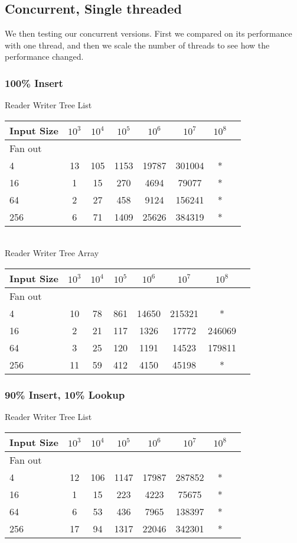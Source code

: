 \documentclass{sig-alternate}
\begin{document}
\subsection{Concurrent, Single threaded}
We then testing our concurrent versions.
First we compared on its performance with one thread, and then we scale the number of threads to see how the performance changed.

\subsubsection{100\% Insert}
Reader Writer Tree List \\
\begin{tabular}{| l | c | c | c | c | c | c | r}
  \hline
  Input Size & $10^3$ & $10^4$ & $10^5$ & $10^6$ & $10^7$ & $10^8$ \\ \hline
  Fan out & & & & & &  \\  \hline
  4			&	13 & 105 & 1153 & 19787 & 301004 & * \\
  16		&	1 & 15 & 270 & 4694 & 79077 & * \\
  64		&	2 & 27 & 458 & 9124 & 156241 & * \\
  256		&	6 & 71 & 1409 & 25626 & 384319 & * \\
  \hline
\end{tabular} \\

Reader Writer Tree Array \\
\begin{tabular}{| l | c | c | c | c | c | c | r}
  \hline
  Input Size & $10^3$ & $10^4$ & $10^5$ & $10^6$ & $10^7$ & $10^8$ \\ \hline
  Fan out & & & & & &  \\  \hline
  4			&	10 & 78 & 861 & 14650 & 215321 & * \\
  16		&	2 & 21 & 117 & 1326 & 17772 & 246069 \\
  64		&	3 & 25 & 120 & 1191 & 14523 & 179811 \\
  256		&	11 & 59 & 412 & 4150 & 45198 & * \\
  \hline
\end{tabular} 


\subsubsection{90\% Insert, 10\% Lookup}
Reader Writer Tree List \\
\begin{tabular}{| l | c | c | c | c | c | c | r}
  \hline
  Input Size & $10^3$ & $10^4$ & $10^5$ & $10^6$ & $10^7$ & $10^8$ \\ \hline
  Fan out & & & & & &  \\  \hline
  4			&	12 & 106 & 1147 & 17987 & 287852 & * \\
  16		&	1 & 15 & 223 & 4223 & 75675 & * \\
  64		&	6 & 53 & 436 & 7965 & 138397 & * \\
  256		&	17 & 94 & 1317 & 22046 & 342301 & * \\
  \hline
\end{tabular} \\
\end{document}
